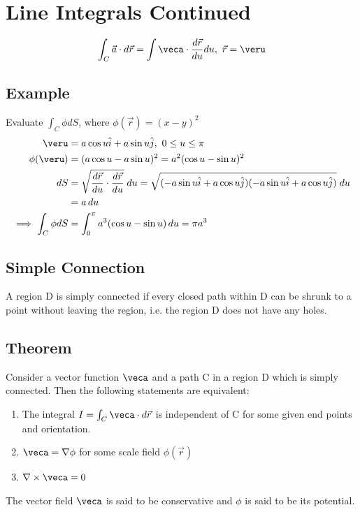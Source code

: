 \documentclass[a4paper, 11pt, normalem]{report}
\begin{document}
\section{Line Integrals Continued}
\begin{equation*}
    \int_C \vec{a} \cdot d\vec{r} = \int \veca \cdot \frac{d\vec{r}}{du}du,~ \vec{r} = \veru
\end{equation*}

\subsection{Example}
Evaluate $\int_C \phi dS$, where $\phi(\vec{r}) = (x - y)^2$
\begin{align*}
    \veru &= a\cos u \hat{i} + a\sin u \hat{j},~ 0 \leq u \leq \pi \\
    \phi(\veru) &= (a\cos u - a\sin u)^2 = a^2(\cos u - \sin u)^2 \\
    dS &= \sqrt{\frac{d\vec{r}}{du}\cdot\frac{d\vec{r}}{du}}\; du = \sqrt{(-a\sin u \hat{i} + a\cos u \hat{j})(-a\sin u \hat{i} + a\cos u \hat{j})}\;du \\
    &= a\,du \\
    \implies \int_C \phi dS &= \int_0^\pi a^3 (\cos u - \sin u)\,du = \pi a^3
\end{align*}

\subsection{Simple Connection}
A region D is simply connected if every closed path within D can be shrunk to a point without leaving the region, i.e. the region D does not have any holes.

\subsection{Theorem}
Consider a vector function $\veca$ and a path C in a region D which is simply connected. Then the following statements are equivalent:
\begin{enumerate}
    \item The integral $I = \int_C \veca \cdot d\vec{r}$ is independent of C for some given end points and orientation.
    \item $\veca = \nabla \phi$ for some scale field $\phi(\vec{r})$
    \item $\nabla \times \veca = 0$
\end{enumerate}
The vector field $\veca$ is said to be conservative and $\phi$ is said to be its potential.
\end{document}
